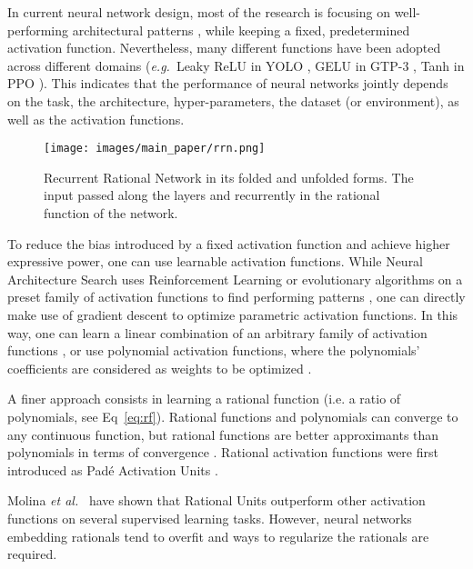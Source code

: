\documentclass{article}
\newcommand{\eg}{\emph{e.g.}~}
\newcommand{\etal}{\emph{et al.}~}
\begin{document}
In current neural network design, most of the research is focusing on well-performing architectural patterns \cite{liu2018progressive, XieZLL19}, while keeping a fixed, predetermined activation function. Nevertheless, many different functions have been adopted across different domains (\eg Leaky ReLU in YOLO \cite{RedmonDGF16}, GELU in GTP-3 \cite{BrownMRSKDNSSAA20}, Tanh in PPO \cite{SchulmanWDRK17}). This indicates that the performance of neural networks jointly depends on the task, the architecture, hyper-parameters, the dataset (or environment), as well as the activation functions.
\begin{figure}[t]
    \centering
    \texttt{[image: images/main\_paper/rrn.png]}
    \caption{Recurrent Rational Network in its folded and unfolded forms. The input passed along the layers and recurrently in the rational function of the network.}
    \label{fig:recratarch}
\end{figure}

To reduce the bias introduced by a fixed activation function and achieve higher expressive power, one can use learnable activation functions. While Neural Architecture Search uses Reinforcement Learning or evolutionary algorithms on a preset family of activation functions to find performing patterns \cite{zoph2016neural, liu2018progressive}, one can directly make use of gradient descent to optimize parametric activation functions. In this way, one can learn a linear combination of an arbitrary family of activation functions \cite{manessi2018learning}, or use polynomial activation functions, where the polynomials' coefficients are considered as weights to be optimized \cite{goyal2019learning}.

A finer approach consists in learning a rational function (i.e. a ratio of polynomials, see Eq~\ref{eq:rf}). Rational functions and polynomials can converge to any continuous function, but rational functions are better approximants than polynomials in terms of convergence \cite{telgarsky2017neural}. Rational activation functions were first introduced as Padé Activation Units \cite{molina2019pad}.

Molina \etal{} have shown that Rational Units outperform other activation functions on several supervised learning tasks. However, neural networks embedding rationals tend to overfit and ways to regularize the rationals are required.
\end{document}
